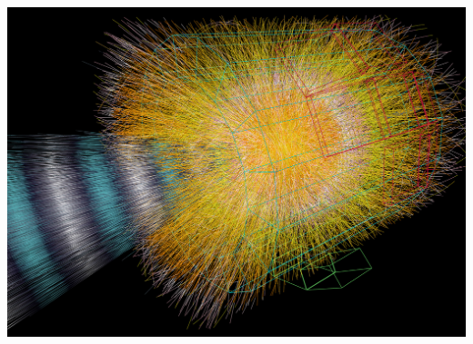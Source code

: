 \documentclass[aspectratio=169]{beamer}
\begin{document}
\begin{frame}{}
\begin{columns}
\includegraphics[width=\linewidth]{090324_ALICE-hirez.jpg}
\end{columns}
\end{frame}
\end{document}
